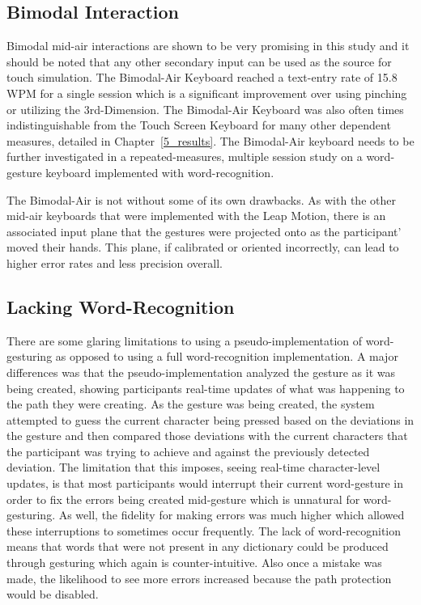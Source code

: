 \subsection{Bimodal Interaction}
Bimodal mid-air interactions are shown to be very promising in this study and it should be noted that any other secondary input can be used as the source for touch simulation. The Bimodal-Air Keyboard reached a text-entry rate of 15.8 WPM for a single session which is a significant improvement over using pinching or utilizing the 3rd-Dimension. The Bimodal-Air Keyboard was also often times indistinguishable from the Touch Screen Keyboard for many other dependent measures, detailed in Chapter~\ref{5_results}. The Bimodal-Air keyboard needs to be further investigated in a repeated-measures, multiple session study on a word-gesture keyboard implemented with word-recognition.

The Bimodal-Air is not without some of its own drawbacks. As with the other mid-air keyboards that were implemented with the Leap Motion, there is an associated input plane that the gestures were projected onto as the participant' moved their hands. This plane, if calibrated or oriented incorrectly, can lead to higher error rates and less precision overall.

\subsection{Lacking Word-Recognition}
There are some glaring limitations to using a pseudo-implementation of word-gesturing as opposed to using a full word-recognition implementation. A major differences was that the pseudo-implementation analyzed the gesture as it was being created, showing participants real-time updates of what was happening to the path they were creating. As the gesture was being created, the system attempted to guess the current character being pressed based on the deviations in the gesture and then compared those deviations with the current characters that the participant was trying to achieve and against the previously detected deviation. The limitation that this imposes, seeing real-time character-level updates, is that most participants would interrupt their current word-gesture in order to fix the errors being created mid-gesture which is unnatural for word-gesturing. As well, the fidelity for making errors was much higher which allowed these interruptions to sometimes occur frequently. The lack of word-recognition means that words that were not present in any dictionary could be produced through gesturing which again is counter-intuitive. Also once a mistake was made, the likelihood to see more errors increased because the path protection would be disabled.

